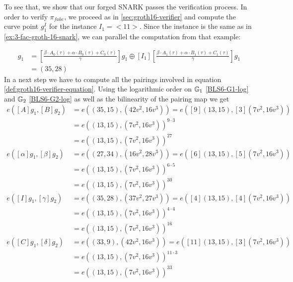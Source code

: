 \begin{example}
To see that, we show that our forged SNARK passes the verification process. In order to verify $\pi_{fake}$, we proceed as in \secname{} \ref{sec:groth16-verifier} and compute the curve point $g_1^I$ for the instance $I_1=<11>$. Since the instance is the same as in \examplename{} \eqref{ex:3-fac-groth-16-snark}, we can parallel the computation from that example:

\begin{align*}
[I]g_1 & = [\frac{\beta\cdot A_{0}(\tau)+\alpha\cdot B_{0}(\tau)+C_{0}(\tau)}{\gamma}]g_1 \oplus [I_1][\frac{\beta\cdot A_{1}(\tau)+\alpha\cdot B_{1}(\tau)+C_{1}(\tau)}{\gamma}]g_1\\
       & = (35,28)
\end{align*} 
In a next step we have to compute all the pairings involved in equation \eqref{def:groth16-verifier-equation}. Using the logarithmic order on $\mathbb{G}_1$ \eqref{BLS6-G1-log} and $\mathbb{G}_2$ \eqref{BLS6-G2-log} as well as the bilinearity of the pairing map we get
\begin{align*}
e([A]g_1,[B]g_2) & = e((35,15),(42v^2,16v^3))
                   = e([9](13,15),[3](7v^2,16v^3))\\
               & = e((13,15),(7v^2,16v^3))^{9\cdot 3}\\ 
               & = e((13,15),(7v^2,16v^3))^{27}\\
e([\alpha]g_1,[\beta]g_2) & = e((27,34),(16v^2,28v^3)) 
                            = e([6](13,15),[5](7v^2,16v^3))\\
               & = e((13,15),(7v^2,16v^3))^{6\cdot 5}\\
               & = e((13,15),(7v^2,16v^3))^{30}\\   
e([I]g_1,[\gamma]g_2) & = e((35,28),(37v^2,27v^3)) 
                            = e([4](13,15),[4](7v^2,16v^3))\\
               & = e((13,15),(7v^2,16v^3))^{4\cdot 4}\\
               & = e((13,15),(7v^2,16v^3))^{16}\\ 
e([C]g_1,[\delta]g_2) & = e((33,9),(42v^2,16v^3)) 
                            = e([11](13,15),[3](7v^2,16v^3))\\
               & = e((13,15),(7v^2,16v^3))^{11\cdot 3}\\
               & = e((13,15),(7v^2,16v^3))^{33}\\                                             
\end{align*}  


\end{example}
